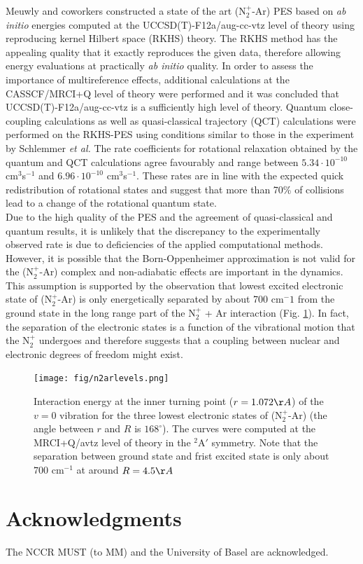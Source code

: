 \documentclass[journal=jacsat,manuscript=article]{achemso}
\begin{document}
\noindent
Meuwly and coworkers\cite{unke.jcp.2016.n2plusargon,denisalpizar.2017.n2plusargon} constructed a state of the art (N$_2^+$-Ar) PES based on \textit{ab initio} energies computed at the UCCSD(T)-F12a/aug-cc-vtz level of theory using reproducing kernel Hilbert space (RKHS) theory.\cite{hollebeek.annrevphychem.1999.rkhs,unke.2017.rkhstoolkit} The RKHS method has the appealing quality that it exactly reproduces the given data, therefore allowing energy evaluations at practically \textit{ab initio} quality.\cite{unke.jcp.2016.n2plusargon} In order to assess the importance of multireference effects, additional calculations at the CASSCF/MRCI+Q level of theory were performed and it was concluded that UCCSD(T)-F12a/aug-cc-vtz is a sufficiently high level of theory.\cite{denisalpizar.2017.n2plusargon}
Quantum close-coupling calculations\cite{denisalpizar.2017.n2plusargon} as well as quasi-classical trajectory (QCT) calculations\cite{unke.jcp.2016.n2plusargon,denisalpizar.2017.n2plusargon} were performed on the RKHS-PES using conditions similar to those in the experiment by Schlemmer \textit{et al.}\cite{schlemmer.ijms.1999.n2plusargon} The rate coefficients for rotational relaxation obtained by the quantum and QCT calculations agree favourably and range between  $5.34 \cdot 10^{-10}$ cm$^3$s$^{-1}$ and $6.96 \cdot 10^{-10}$ cm$^3$s$^{-1}$.\cite{denisalpizar.2017.n2plusargon} These rates are in line with the expected quick redistribution of rotational states and suggest that more than 70\% of collisions lead to a change of the rotational quantum state.\\
\noindent Due to the high quality of the PES and the agreement of quasi-classical and quantum results, it is unlikely that the discrepancy to the experimentally observed rate is due to deficiencies of the applied computational methods. However, it is possible that the Born-Oppenheimer approximation is not valid for the (N$_2^+$-Ar) complex and non-adiabatic effects are important in the dynamics. This assumption is supported by the observation that lowest excited electronic state of  (N$_2^+$-Ar) is only energetically separated by about 700 cm$^-1$ from the ground state in the long range part of the N$_2^+$ + Ar interaction (Fig. \ref{fig:n2arlevels}). In fact, the separation of the electronic states is a function of the vibrational motion that the N$_2^+$ undergoes and therefore suggests that a coupling between nuclear and electronic degrees of freedom might exist.\cite{denisalpizar.2017.n2plusargon}

\begin{figure}
	\texttt{[image: fig/n2arlevels.png]}
	\caption{Interaction energy at the inner turning point ($r = 1.072 \AA$) of the $v = 0$ vibration for the three lowest electronic states of (N$_2^+$-Ar) (the angle between $r$ and $R$ is $168^{\circ}$). The curves were computed at the MRCI+Q/avtz level of theory in the $^2$A$'$ symmetry. Note that the separation between ground state and frist excited state is only about $700$ cm$^{-1}$ at around $R=4.5\AA$}
	\label{fig:n2arlevels}
\end{figure}
    
\section*{Acknowledgments}
The NCCR MUST (to MM) and the University of Basel are acknowledged.



\end{document}
